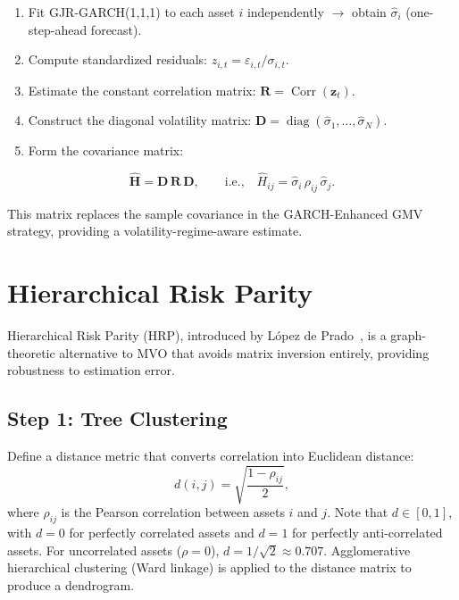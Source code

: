 \documentclass[12pt,a4paper]{article}
\newcommand{\Corr}{\operatorname{Corr}}
\newcommand{\diag}{\operatorname{diag}}
\begin{document}
\begin{enumerate}[nosep]
    \item Fit GJR-GARCH(1,1,1) to each asset $i$ independently $\to$ obtain $\hat{\sigma}_i$ (one-step-ahead forecast).
    \item Compute standardized residuals: $z_{i,t} = \varepsilon_{i,t} / \sigma_{i,t}$.
    \item Estimate the constant correlation matrix: $\bm{R} = \Corr(\bm{z}_t)$.
    \item Construct the diagonal volatility matrix: $\bm{D} = \diag(\hat{\sigma}_1, \ldots, \hat{\sigma}_N)$.
    \item Form the covariance matrix:
\end{enumerate}
\begin{equation}
    \hat{\bm{H}} = \bm{D}\,\bm{R}\,\bm{D}, \qquad \text{i.e.,}\quad
    \hat{H}_{ij} = \hat{\sigma}_i\,\rho_{ij}\,\hat{\sigma}_j.
    \label{eq:garch-cov}
\end{equation}

This matrix replaces the sample covariance in the GARCH-Enhanced GMV strategy, providing a volatility-regime-aware estimate.

\section{Hierarchical Risk Parity}
\label{sec:hrp}

Hierarchical Risk Parity (HRP), introduced by L\'opez de Prado~\cite{lopezdeprado2016}, is a graph-theoretic alternative to MVO that avoids matrix inversion entirely, providing robustness to estimation error.

\subsection{Step 1: Tree Clustering}

Define a distance metric that converts correlation into Euclidean distance:
\begin{equation}
    d(i, j) = \sqrt{\frac{1 - \rho_{ij}}{2}},
    \label{eq:hrp-distance}
\end{equation}
where $\rho_{ij}$ is the Pearson correlation between assets $i$ and $j$. Note that $d \in [0, 1]$, with $d = 0$ for perfectly correlated assets and $d = 1$ for perfectly anti-correlated assets. For uncorrelated assets ($\rho = 0$), $d = 1/\sqrt{2} \approx 0.707$. Agglomerative hierarchical clustering (Ward linkage) is applied to the distance matrix to produce a dendrogram.
\end{document}

